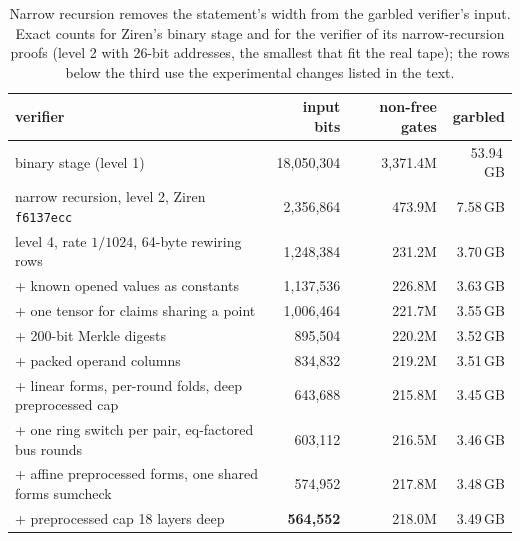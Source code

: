 \documentclass[11pt]{article}
\begin{document}
\begin{table}[t]\centering\small
\begin{tabular}{lrrr}\toprule
verifier & input bits & non-free gates & garbled\\\midrule
binary stage (level 1) & 18{,}050{,}304 & 3{,}371.4M & 53.94\,GB\\
narrow recursion, level 2, Ziren \texttt{f6137ecc} & 2{,}356{,}864 & 473.9M & 7.58\,GB\\
level 4, rate $1/1024$, 64-byte rewiring rows & 1{,}248{,}384 & 231.2M & 3.70\,GB\\
\quad + known opened values as constants & 1{,}137{,}536 & 226.8M & 3.63\,GB\\
\quad + one tensor for claims sharing a point & 1{,}006{,}464 & 221.7M & 3.55\,GB\\
\quad + 200-bit Merkle digests & 895{,}504 & 220.2M & 3.52\,GB\\
\quad + packed operand columns & 834{,}832 & 219.2M & 3.51\,GB\\
\quad + linear forms, per-round folds, deep preprocessed cap & 643{,}688 & 215.8M & 3.45\,GB\\
\quad + one ring switch per pair, eq-factored bus rounds & 603{,}112 & 216.5M & 3.46\,GB\\
\quad + affine preprocessed forms, one shared forms sumcheck & 574{,}952 & 217.8M & 3.48\,GB\\
\quad + preprocessed cap 18 layers deep & \textbf{564{,}552} & 218.0M & 3.49\,GB\\\bottomrule
\end{tabular}
\caption{Narrow recursion removes the statement's width from the garbled
verifier's input. Exact counts for Ziren's binary stage and for the verifier of its narrow-recursion proofs (level 2 with 26-bit addresses, the
smallest that fit the real tape); the rows below the third use the experimental
changes listed in the text.}
\label{tab:recursion}
\end{table}
\end{document}
